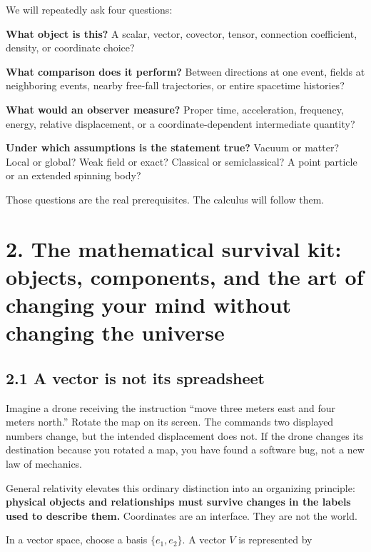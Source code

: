 \documentclass[
  11pt,
  letterpaper,
  oneside,
  openany]{scrbook}
\begin{document}
We will repeatedly ask four questions:

\textbf{What object is this?} A scalar, vector, covector, tensor,
connection coefficient, density, or coordinate choice?

\textbf{What comparison does it perform?} Between directions at one
event, fields at neighboring events, nearby free-fall trajectories, or
entire spacetime histories?

\textbf{What would an observer measure?} Proper time, acceleration,
frequency, energy, relative displacement, or a coordinate-dependent
intermediate quantity?

\textbf{Under which assumptions is the statement true?} Vacuum or
matter? Local or global? Weak field or exact? Classical or
semiclassical? A point particle or an extended spinning body?

Those questions are the real prerequisites. The calculus will follow
them.

\hypertarget{chapter-2}{%
\chapter{2. The mathematical survival kit: objects, components, and the
art of changing your mind without changing the
universe}\label{chapter-2}}

\hypertarget{a-vector-is-not-its-spreadsheet}{%
\section{2.1 A vector is not its
spreadsheet}\label{a-vector-is-not-its-spreadsheet}}

Imagine a drone receiving the instruction ``move three meters east and
four meters north.'' Rotate the map on its screen. The
command\textquotesingle s two displayed numbers change, but the intended
displacement does not. If the drone changes its destination because you
rotated a map, you have found a software bug, not a new law of
mechanics.

General relativity elevates this ordinary distinction into an organizing
principle: \textbf{physical objects and relationships must survive
changes in the labels used to describe them.} Coordinates are an
interface. They are not the world.

In a vector space, choose a basis \(\{e_1,e_2\}\). A vector \(V\) is
represented by

\begin{center}
\begingroup
{}
\ifdim\wd\grmathbox>\linewidth
\resizebox{\linewidth}{!}{\usebox{\grmathbox}}
\else\usebox{\grmathbox}\fi
\endgroup
\end{center}
\end{document}
